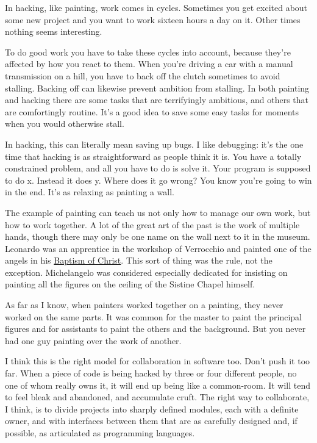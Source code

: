 \documentclass[12pt]{book}
\begin{document}
In hacking, like painting, work comes in cycles. Sometimes you get
excited about some new project and you want to work sixteen hours a day
on it. Other times nothing seems interesting.

To do good work you have to take these cycles into account, because
they're affected by how you react to them. When you're driving a car
with a manual transmission on a hill, you have to back off the clutch
sometimes to avoid stalling. Backing off can likewise prevent ambition
from stalling. In both painting and hacking there are some tasks that
are terrifyingly ambitious, and others that are comfortingly routine.
It's a good idea to save some easy tasks for moments when you would
otherwise stall.

In hacking, this can literally mean saving up bugs. I like debugging:
it's the one time that hacking is as straightforward as people think it
is. You have a totally constrained problem, and all you have to do is
solve it. Your program is supposed to do x. Instead it does y. Where
does it go wrong? You know you're going to win in the end. It's as
relaxing as painting a wall.

The example of painting can teach us not only how to manage our own
work, but how to work together. A lot of the great art of the past is
the work of multiple hands, though there may only be one name on the
wall next to it in the museum. Leonardo was an apprentice in the
workshop of Verrocchio and painted one of the angels in his
\href{baptism.html}{Baptism of Christ}. This sort of thing was the rule,
not the exception. Michelangelo was considered especially dedicated for
insisting on painting all the figures on the ceiling of the Sistine
Chapel himself.

As far as I know, when painters worked together on a painting, they
never worked on the same parts. It was common for the master to paint
the principal figures and for assistants to paint the others and the
background. But you never had one guy painting over the work of another.

I think this is the right model for collaboration in software too. Don't
push it too far. When a piece of code is being hacked by three or four
different people, no one of whom really owns it, it will end up being
like a common-room. It will tend to feel bleak and abandoned, and
accumulate cruft. The right way to collaborate, I think, is to divide
projects into sharply defined modules, each with a definite owner, and
with interfaces between them that are as carefully designed and, if
possible, as articulated as programming languages.
\end{document}
